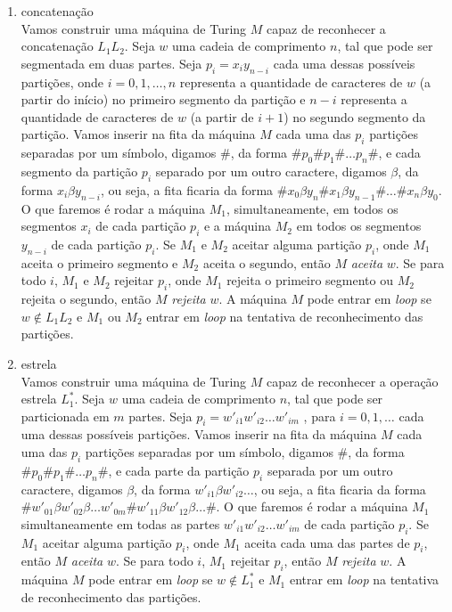 \begin{enumerate}[label={\textbf{\alph*.}}]
    \item concatenação\\[3pt]
    Vamos construir uma máquina de Turing $M$ capaz de reconhecer a concatenação $L_1L_2$.
    Seja $w$ uma cadeia de comprimento $n$, tal que pode ser segmentada em duas partes. Seja $p_i = x_iy_{n-i}$ cada uma dessas possíveis partições, onde $i = 0, 1, \ldots, n$ representa a quantidade de caracteres de $w$ (a partir do início) no primeiro segmento da partição e $n - i$ representa a quantidade de caracteres de $w$ (a partir de $i + 1$) no segundo segmento da partição.
    Vamos inserir na fita da máquina $M$ cada uma das $p_i$ partições separadas por um símbolo, digamos $\texttt{\#}$, da forma $\texttt{\#}p_0\texttt{\#}p_1\texttt{\#}\ldots p_n\texttt{\#}$, e cada segmento da partição $p_i$ separado por um outro caractere, digamos $\beta$, da forma $x_i\beta y_{n-i}$, ou seja, a fita ficaria da forma $\texttt{\#}x_0\beta y_n\texttt{\#}x_1\beta y_{n-1}\texttt{\#}\ldots \texttt{\#}x_n\beta y_0$. O que faremos é rodar a máquina $M_1$, simultaneamente, em todos os segmentos $x_i$ de cada partição $p_i$ e a máquina $M_2$ em todos os segmentos $y_{n-i}$ de cada partição $p_i$.
    Se $M_1$ e $M_2$ aceitar alguma partição $p_i$, onde $M_1$ aceita o primeiro segmento e $M_2$ aceita o segundo, então $M$ \textit{aceita} $w$. Se para todo $i$, $M_1$ e $M_2$ rejeitar $p_i$, onde $M_1$ rejeita o primeiro segmento ou $M_2$ rejeita o segundo, então $M$ \textit{rejeita} $w$. A máquina $M$ pode entrar em \textit{loop} se $w \notin L_1L_2$ e $M_1$ ou $M_2$ entrar em \textit{loop} na tentativa de reconhecimento das partições.
    
    \item estrela\\[3pt]
    Vamos construir uma máquina de Turing $M$ capaz de reconhecer a operação estrela $L_1^*$.
    Seja $w$ uma cadeia de comprimento $n$, tal que pode ser particionada em $m$ partes. Seja $p_i = w'_{i1}w'_{i2} \ldots w'_{im}$ , para $i = 0, 1, \ldots$ cada uma dessas possíveis partições.
    Vamos inserir na fita da máquina $M$ cada uma das $p_i$ partições separadas por um símbolo, digamos $\texttt{\#}$, da forma $\texttt{\#}p_0\texttt{\#}p_1\texttt{\#} \ldots p_n\texttt{\#}$, e cada parte da partição $p_i$ separada por um outro caractere, digamos $\beta$, da forma $w'_{i1}\beta w'_{i2} \ldots$, ou seja, a fita ficaria da forma $\texttt{\#}w'_{01}\beta w'_{02}\beta \ldots w'_{0m}\texttt{\#}w'_{11}\beta w'_{12}\beta \ldots \texttt{\#}$.
    O que faremos é rodar a máquina $M_1$ simultaneamente em todas as partes $w'_{i1}w'_{i2}\ldots w'_{im}$ de cada partição $p_i$. Se $M_1$ aceitar alguma partição $p_i$, onde $M_1$ aceita cada uma das partes de $p_i$, então $M$ \textit{aceita} $w$. Se para todo $i$, $M_1$ rejeitar $p_i$, então $M$ \textit{rejeita} $w$. A máquina $M$ pode entrar em \textit{loop} se $w \notin L_1^*$ e $M_1$ entrar em \textit{loop} na tentativa de reconhecimento das partições.
    

\end{enumerate}
